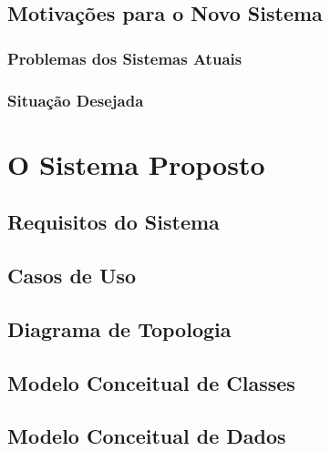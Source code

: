 \documentclass[a4paper]{abntex2}
\begin{document}
\section{Motivações para o Novo Sistema}

\subsection{Problemas dos Sistemas Atuais}

\subsection{Situação Desejada}

\chapter{O Sistema Proposto}

\section{Requisitos do Sistema}

\pagebreak
\section{Casos de Uso}

\section{Diagrama de Topologia}

\section{Modelo Conceitual de Classes}

\section{Modelo Conceitual de Dados}

\printbibliography
\end{document}
